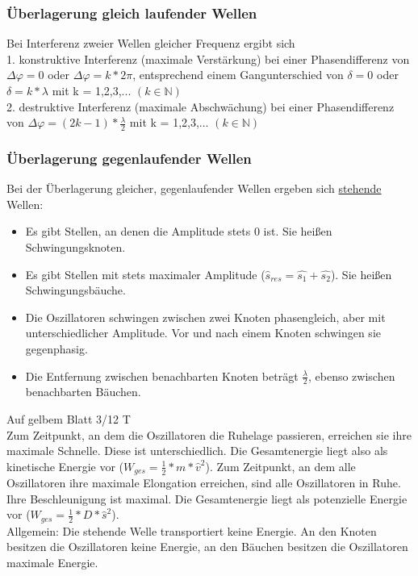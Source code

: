 \subsubsection{Überlagerung gleich laufender Wellen}
Bei Interferenz zweier Wellen gleicher Frequenz ergibt sich \\
1. konstruktive Interferenz (maximale Verstärkung) bei einer Phasendifferenz von $\Delta \varphi = 0$ oder $\Delta \varphi = k \ast 2 \pi $, entsprechend einem Gangunterschied von $ \delta = 0 $ oder $ \delta = k \ast \lambda $ mit k = 1,2,3,... $(k \in \mathbb{N})$ \\
2. destruktive Interferenz (maximale Abschwächung) bei einer Phasendifferenz von $ \Delta \varphi = (2k-1) \ast \frac{\lambda}{2} $ mit k = 1,2,3,... $(k \in \mathbb{N})$ \\

\subsubsection{Überlagerung gegenlaufender Wellen}
Bei der Überlagerung gleicher, gegenlaufender Wellen ergeben sich \underline{stehende} Wellen:
\vspace{1mm} \\
\begin{itemize}
	\item Es gibt Stellen, an denen die Amplitude stets 0 ist. Sie heißen Schwingungsknoten. \\
	\item Es gibt Stellen mit stets maximaler Amplitude ($\hat{s}_{res} = \hat{s_{1}} + \hat{s_{2}} $). Sie heißen Schwingungsbäuche. \\
	\item Die Oszillatoren schwingen zwischen zwei Knoten phasengleich, aber mit unterschiedlicher Amplitude. Vor und nach einem Knoten schwingen sie gegenphasig. \\
	\item Die Entfernung zwischen benachbarten Knoten beträgt $\frac{\lambda}{2}$, ebenso zwischen benachbarten Bäuchen.
\end{itemize}
Auf gelbem Blatt 3/12 T
\vspace{2mm} \\
Zum Zeitpunkt, an dem die Oszillatoren die Ruhelage passieren, erreichen sie ihre maximale Schnelle. Diese ist unterschiedlich. Die Gesamtenergie liegt also als kinetische Energie vor ($W_{ges} = \frac{1}{2} \ast m \ast \hat{v}^{2} $). Zum Zeitpunkt, an dem alle Oszillatoren ihre maximale Elongation erreichen, sind alle Oszillatoren in Ruhe. Ihre Beschleunigung ist maximal. Die Gesamtenergie liegt als potenzielle Energie vor ($W_{ges} = \frac{1}{2} \ast D \ast \hat{s}^{2}$). \\
Allgemein: Die stehende Welle transportiert keine Energie. An den Knoten besitzen die Oszillatoren keine Energie, an den Bäuchen besitzen die Oszillatoren maximale Energie. 
\vspace{5mm} \\


